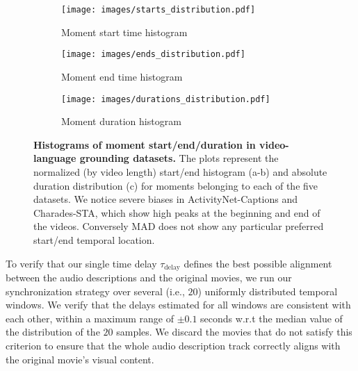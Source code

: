 \documentclass[10pt,twocolumn,letterpaper]{article}
\begin{document}
\begin{figure*}[ht!]
    \vspace{-0.2cm}
    \centering
    \begin{subfigure}[t]{0.325\linewidth}
        \centering
        \texttt{[image: images/starts\_distribution.pdf]}
        \caption{Moment start time histogram}
        \label{fig:starts}
    \end{subfigure}\begin{subfigure}[t]{0.31\linewidth}
        \centering
        \texttt{[image: images/ends\_distribution.pdf]}
        \caption{Moment end time histogram}
        \label{fig:ends}
    \end{subfigure}\begin{subfigure}[t]{0.35\linewidth}
        \centering
        \texttt{[image: images/durations\_distribution.pdf]}
        \caption{Moment duration histogram}
        \label{fig:durations}
    \end{subfigure}
    \caption{\textbf{Histograms of moment start/end/duration in video-language grounding datasets.} The plots represent the normalized (by video length) start/end histogram (a-b) and absolute duration distribution (c) for moments belonging to each of the five datasets. We notice severe biases in ActivityNet-Captions and Charades-STA, which show high peaks at the beginning and end of the videos. Conversely MAD does not show any particular preferred start/end temporal location.
    }
    \label{fig:dataset-attributes}
    \vspace{-0.4cm}
\end{figure*}
 To verify that our single time delay $\tau_{\mathrm{delay}}$ defines the best possible alignment between the audio descriptions and the original movies, we run our synchronization strategy over several (i.e., $20$) uniformly distributed temporal windows. 
We verify that the delays estimated for all windows are consistent with each other, within a maximum range of $\pm0.1$ seconds w.r.t the median value of the distribution of the $20$ samples. We discard the movies that do not satisfy this criterion to ensure that the whole audio description track correctly aligns with the original movie's visual content.
\end{document}
